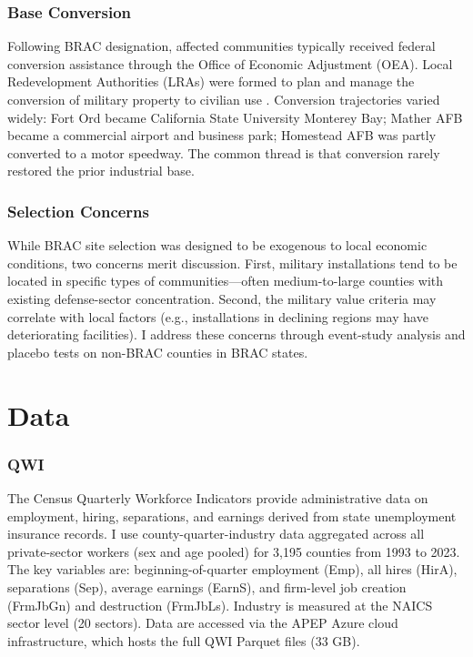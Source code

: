\documentclass[12pt]{article}
\begin{document}
\subsubsection*{Base Conversion} Following BRAC designation, affected communities typically received federal conversion assistance through the Office of Economic Adjustment (OEA). Local Redevelopment Authorities (LRAs) were formed to plan and manage the conversion of military property to civilian use \citep{gao2005}. Conversion trajectories varied widely: Fort Ord became California State University Monterey Bay; Mather AFB became a commercial airport and business park; Homestead AFB was partly converted to a motor speedway. The common thread is that conversion rarely restored the prior industrial base.

\subsubsection*{Selection Concerns} While BRAC site selection was designed to be exogenous to local economic conditions, two concerns merit discussion. First, military installations tend to be located in specific types of communities---often medium-to-large counties with existing defense-sector concentration. Second, the military value criteria may correlate with local factors (e.g., installations in declining regions may have deteriorating facilities). I address these concerns through event-study analysis and placebo tests on non-BRAC counties in BRAC states.

\section{Data}

\subsubsection*{QWI} The Census Quarterly Workforce Indicators provide administrative data on employment, hiring, separations, and earnings derived from state unemployment insurance records. I use county-quarter-industry data aggregated across all private-sector workers (sex and age pooled) for 3,195 counties from 1993 to 2023. The key variables are: beginning-of-quarter employment (Emp), all hires (HirA), separations (Sep), average earnings (EarnS), and firm-level job creation (FrmJbGn) and destruction (FrmJbLs). Industry is measured at the NAICS sector level (20 sectors). Data are accessed via the APEP Azure cloud infrastructure, which hosts the full QWI Parquet files (33 GB).
\end{document}
